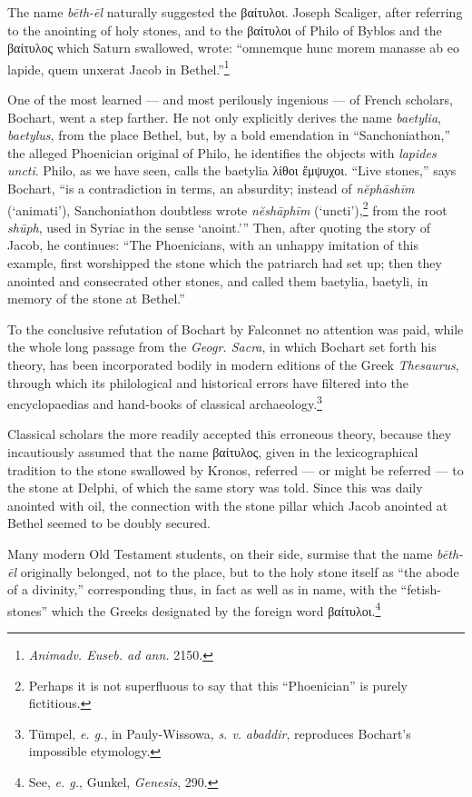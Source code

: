 \documentclass[a4paper, 12pt, oneside, polutonikogreek, english]{article}
\begin{document}
The name \emph{bēth-ēl} naturally suggested the βαίτυλοι. Joseph Scaliger, after referring to the anointing of holy stones, and to the βαίτυλοι of Philo of Byblos and the βαίτυλος which Saturn swallowed, wrote: ``omnemque hunc morem manasse ab eo lapide, quem unxerat Jacob in Bethel.''\footnote{\emph{Animadv. Euseb. ad ann.} 2150.}

One of the most learned --- and most perilously ingenious --- of French scholars, Bochart, went a step farther. He not only explicitly derives the name \emph{baetylia}, \emph{baetylus}, from the place Bethel, but, by a bold emendation in ``Sanchoniathon,'' the alleged Phoenician original of Philo, he identifies the objects with \emph{lapides uncti}. Philo, as we have seen, calls the baetylia λίθοι ἔμψυχοι. ``Live stones,'' says Bochart, ``is a contradiction in terms, an absurdity; instead of \emph{nĕphāshīm} (`animati'), Sanchoniathon doubtless wrote \emph{nĕshāphīm} (`uncti'),\footnote{Perhaps it is not superfluous to say that this ``Phoenician'' is purely fictitious.} from the root \emph{shūph}, used in Syriac in the sense `anoint.''' Then, after quoting the story of Jacob, he continues: ``The Phoenicians, with an unhappy imitation of this example, first worshipped the stone which the patriarch had set up; then they anointed and consecrated other stones, and called them baetylia, baetyli, in memory of the stone at Bethel.''

To the conclusive refutation of Bochart by Falconnet no attention was paid, while the whole long passage from the \emph{Geogr. Sacra}, in which Bochart set forth his theory, has been incorporated bodily in modern editions of the Greek \emph{Thesaurus}, through which its philological and historical errors have filtered into the encyclopaedias and hand-books of classical archaeology.\footnote{Tümpel, \emph{e. g.}, in Pauly-Wissowa, \emph{s. v.} \emph{abaddir}, reproduces Bochart's impossible etymology.}

Classical scholars the more readily accepted this erroneous theory, because they incautiously assumed that the name βαίτυλος, given in the lexicographical tradition to the stone swallowed by Kronos, referred --- or might be referred --- to the stone at Delphi, of which the same story was told. Since this was daily anointed with oil, the connection with the stone pillar which Jacob anointed at Bethel seemed to be doubly secured.

Many modern Old Testament students, on their side, surmise that the name \emph{bēth-ēl} originally belonged, not to the place, but to the holy stone itself as ``the abode of a divinity,'' corresponding thus, in fact as well as in name, with the ``fetish-stones'' which the Greeks designated by the foreign word βαίτυλοι.\footnote{See, \emph{e. g.}, Gunkel, \emph{Genesis}, 290.}
\end{document}
